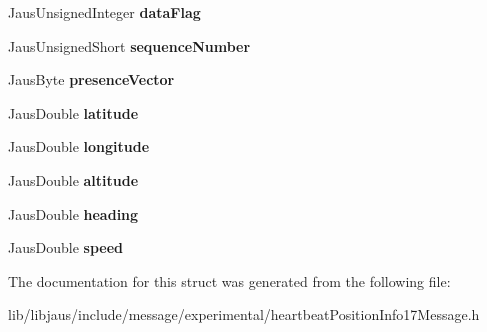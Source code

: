 \begin{DoxyCompactItemize}
\item 
\hypertarget{struct_heartbeat_position_info17_message_struct_a4b8a8fd7894379ca2bd4ac6c715abb46}{\-Jaus\-Unsigned\-Integer {\bfseries data\-Flag}}\label{struct_heartbeat_position_info17_message_struct_a4b8a8fd7894379ca2bd4ac6c715abb46}

\item 
\hypertarget{struct_heartbeat_position_info17_message_struct_a0a1725902d8fd57b5d989faf368b098a}{\-Jaus\-Unsigned\-Short {\bfseries sequence\-Number}}\label{struct_heartbeat_position_info17_message_struct_a0a1725902d8fd57b5d989faf368b098a}

\item 
\hypertarget{struct_heartbeat_position_info17_message_struct_ad9d9715f1358daa06c4acee2c328a31d}{\-Jaus\-Byte {\bfseries presence\-Vector}}\label{struct_heartbeat_position_info17_message_struct_ad9d9715f1358daa06c4acee2c328a31d}

\item 
\hypertarget{struct_heartbeat_position_info17_message_struct_a4620fcdd3e973e27a311db97511cde51}{\-Jaus\-Double {\bfseries latitude}}\label{struct_heartbeat_position_info17_message_struct_a4620fcdd3e973e27a311db97511cde51}

\item 
\hypertarget{struct_heartbeat_position_info17_message_struct_a1259b9efa06bbc4fa7bf2eb1c00416e6}{\-Jaus\-Double {\bfseries longitude}}\label{struct_heartbeat_position_info17_message_struct_a1259b9efa06bbc4fa7bf2eb1c00416e6}

\item 
\hypertarget{struct_heartbeat_position_info17_message_struct_a229adfe8a6963d36dee49abaeb7fe30c}{\-Jaus\-Double {\bfseries altitude}}\label{struct_heartbeat_position_info17_message_struct_a229adfe8a6963d36dee49abaeb7fe30c}

\item 
\hypertarget{struct_heartbeat_position_info17_message_struct_a0aaac1e453c670d27005601dc4008c70}{\-Jaus\-Double {\bfseries heading}}\label{struct_heartbeat_position_info17_message_struct_a0aaac1e453c670d27005601dc4008c70}

\item 
\hypertarget{struct_heartbeat_position_info17_message_struct_a9db8a42e47480ca7c2cd38aa0eee06a8}{\-Jaus\-Double {\bfseries speed}}\label{struct_heartbeat_position_info17_message_struct_a9db8a42e47480ca7c2cd38aa0eee06a8}

\end{DoxyCompactItemize}


\-The documentation for this struct was generated from the following file\-:\begin{DoxyCompactItemize}
\item 
lib/libjaus/include/message/experimental/heartbeat\-Position\-Info17\-Message.\-h\end{DoxyCompactItemize}
